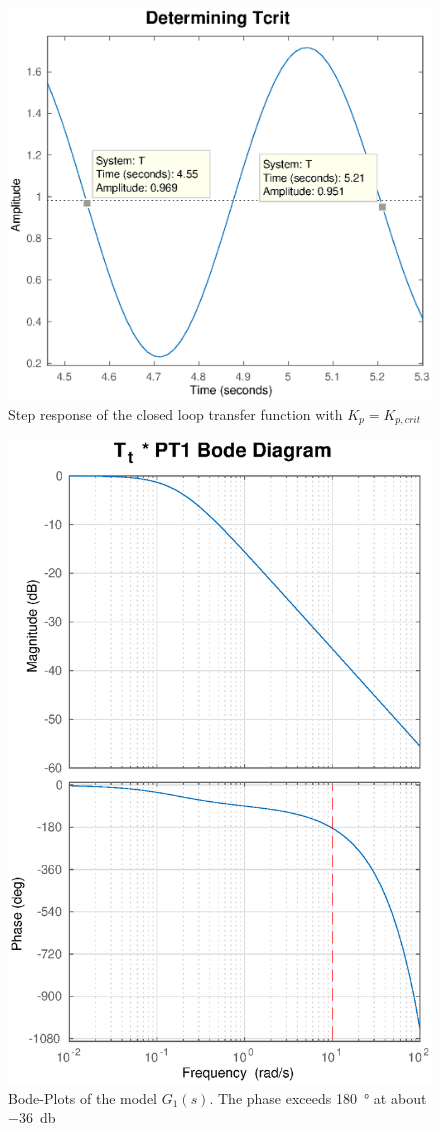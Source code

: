 \begin{figure}[h]
    \centering
    \includegraphics[width=\imagewidth]{images/tcrit}
    \caption{Step response of the closed loop transfer function with $K_p=K_{p,crit}$}
    \label{fig:Tt_PT1_tcrit}
\end{figure}

\begin{figure}[h]
    \centering
    \includegraphics[width=\imagewidth]{images/Tt_PT1_bode}
    \caption{Bode-Plots of the model $G_1(s)$. The phase exceeds \SI{180}{\degree} at about \SI{-36}{\decibel}}
    \label{fig:Tt_PT1_bode}
\end{figure}

